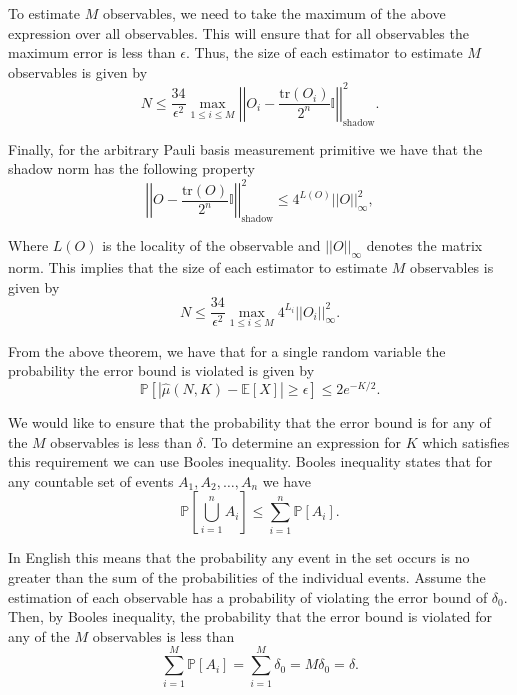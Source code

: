 \documentclass[12pt]{article}
\begin{document}
    To estimate $M$ observables, we need to take the maximum of the above expression over all observables. This will ensure that for all observables the maximum error is less than $\epsilon$. Thus, the size of each estimator to estimate $M$ observables is given by
    \begin{equation}
        N \leq \frac{34}{\epsilon^2} \max_{1\leq i \leq M} \left|\left| O_i - \frac{\text{tr}(O_i)}{2^n} \mathbb{I} \right|\right|^2_\text{shadow}.
    \end{equation}

    Finally, for the arbitrary Pauli basis measurement primitive we have that the shadow norm has the following property
    \begin{equation}
        \left|\left| O - \frac{\text{tr}(O)}{2^n} \mathbb{I} \right|\right|^2_\text{shadow} \leq 4^{L(O)} ||O||^2_\infty,
    \end{equation}

    Where $L(O)$ is the locality of the observable and $||O||_\infty$ denotes the matrix norm. This implies that the size of each estimator to estimate $M$ observables is given by
    \begin{equation}
        N \leq \frac{34}{\epsilon^2} \max_{1\leq i \leq M} 4^{L_i} ||O_i||^2_\infty.
    \end{equation}

    From the above theorem, we have that for a single random variable the probability the error bound is violated is given by
    \begin{equation}
        \mathbb{P}[|\hat{\mu}(N, K) - \mathbb{E}[X]| \geq \epsilon] \leq 2e^{-K/2}.
    \end{equation}

    We would like to ensure that the probability that the error bound is for any of the $M$ observables is less than $\delta$. To determine an expression for $K$ which satisfies this requirement we can use Booles inequality. Booles inequality states that for any countable set of events $A_1, A_2, \ldots, A_n$ we have
    \begin{equation}
        \mathbb{P}\left[\bigcup_{i=1}^n A_i\right] \leq \sum_{i=1}^n \mathbb{P}[A_i].
    \end{equation}

    In English this means that the probability any event in the set occurs is no greater than the sum of the probabilities of the individual events. Assume the estimation of each observable has a probability of violating the error bound of $\delta_0$. Then, by Booles inequality, the probability that the error bound is violated for any of the $M$ observables is less than
    \begin{equation*}
        \sum_{i=1}^M \mathbb{P}[A_i] = \sum_{i=1}^M \delta_0 = M\delta_0 = \delta.
    \end{equation*}
\end{document}
